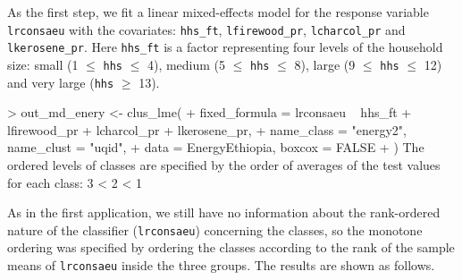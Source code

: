 As the first step, we fit a linear mixed-effects model for the response variable \texttt{lrconsaeu} with the covariates: \texttt{hhs\_ft}, \texttt{lfirewood\_pr}, \texttt{lcharcol\_pr} and \texttt{lkerosene\_pr}. Here \texttt{hhs\_ft} is a factor representing four levels of the household size: small (1 $\le$ \texttt{hhs} $\le$ 4), medium (5 $\le$ \texttt{hhs} $\le$ 8), large (9 $\le$ \texttt{hhs} $\le$ 12) and very large (\texttt{hhs} $\ge$ 13).
\begin{example}
> out_md_enery <- clus_lme(
+   fixed_formula = lrconsaeu ~ hhs_ft + lfirewood_pr + lcharcol_pr + lkerosene_pr,
+   name_class = "energy2", name_clust = "uqid",
+   data = EnergyEthiopia, boxcox = FALSE
+ )
The ordered levels of classes are specified by the order of 
 averages of the test values for each class:
3 < 2 < 1
\end{example}
As in the first application, we still have no information about the rank-ordered nature of the classifier (\texttt{lrconsaeu}) concerning the classes, so the monotone ordering was specified by ordering the classes according to the rank of the sample means of \texttt{lrconsaeu} inside the three groups. The results are shown as follows.
